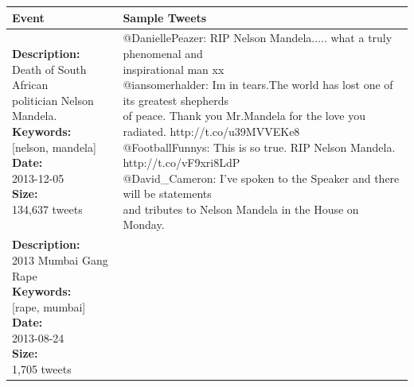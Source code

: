 \documentclass[10pt,letterpaper]{article}
\begin{document}
\begin{table}[!htb]
  \centering
  {\scriptsize
    \begin{tabular*}{1\linewidth}{p{5cm}p{5cm}}
      \toprule
      \textbf{Event} & \textbf{Sample Tweets} \\
      \midrule
      \pbox{20cm}{\textbf{Description:}\\ Death of South African\\ politician Nelson Mandela. \vspace{.1cm}\\
        \textbf{Keywords:}\\ {[}nelson, mandela{]}\vspace{.1cm}\\
        \textbf{Date:}\\ 2013-12-05 \vspace{.1cm}\\
        \textbf{Size:} \\ 134,637 tweets}
      & \pbox{20cm}{
        @DaniellePeazer: RIP Nelson Mandela..... what a truly phenomenal and\\ inspirational man xx\vspace{.1cm}\\
        @iansomerhalder: Im in tears.The world has lost one of its greatest shepherds \\of peace. Thank you Mr.Mandela for the love you radiated. http://t.co/u39MVVEKe8\vspace{.1cm}\\
        @FootballFunnys: This is so true. RIP Nelson Mandela. http://t.co/vF9xri8LdP\vspace{.1cm}\\
        @David\_Cameron: I've spoken to the Speaker and there will be statements \\and tributes to Nelson Mandela in the House on Monday.} \\
      \midrule
      \pbox{20cm}{\textbf{Description:}\\ 2013 Mumbai Gang Rape \vspace{.1cm}\\
        \textbf{Keywords:}\\ {[}rape, mumbai{]}\vspace{.1cm}\\
        \textbf{Date:}\\ 2013-08-24 \vspace{.1cm}\\
        \textbf{Size:} \\1,705 tweets}

\end{tabular*}}
\end{table}
\end{document}
